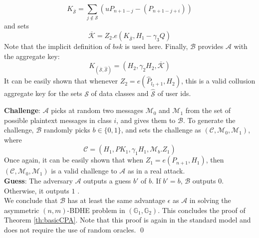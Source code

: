 \begin{equation}
 K_{\overline{\mathcal{S}}} = \sum_{j\notin\mathcal{S}}({u}P_{n+1-j}-(P_{n+1-j+i})) \nonumber
\end{equation}
\noindent and sets
\begin{equation}
 \overline{\mathcal{K}} = Z_2.e(K_{\overline{\mathcal{S}}},H_1-\gamma_3Q)\nonumber
\end{equation}
\noindent Note that the implicit definition of $bsk$ is used here. Finally, $\mathcal{B}$ provides $\mathcal{A}$ with the aggregate key:
\begin{equation}
 K_{\left(\overline{\mathcal{S}},\hat{\mathcal{S}}\right)} = (H_2,\gamma_2H_2,\overline{\mathcal{K}})\nonumber
\end{equation}
\noindent It can be easily shown that whenever $Z_2={e}(\hat{P}_{l_2+1},H_2)$, this is a valid collusion aggregate key for the sets $\mathcal{S}$ of data classes and $\hat{\mathcal{S}}$ of user ids.
 
\noindent \textbf{Challenge}: $\mathcal{A}$ picks at random two messages $\mathcal{M}_0$ and $\mathcal{M}_1$ from the set of possible plaintext messages in class $i$, and gives them to $\mathcal{B}$. To generate the challenge, $\mathcal{B}$ randomly picks $b\in\{0,1\}$, and sets the challenge as $(\mathcal{C},\mathcal{M}_0,\mathcal{M}_1)$, where 
\begin{equation}
\mathcal{C}=(H_1,PK_1,\gamma_1 H_1,\mathcal{M}_b.Z_1)\nonumber
\end{equation}
\noindent Once again, it can be easily shown that when $Z_1={e}(P_{n+1},H_1)$, then $(\mathcal{C},\mathcal{M}_0,\mathcal{M}_1)$ is a valid challenge to $\mathcal{A}$ as in a real attack.\\
 
\noindent \textbf{Guess}: The adversary $\mathcal{A}$ outputs a guess $b'$ of $b$. If $b' = b$, $\mathcal{B}$ outputs $0$. Otherwise, it outputs $1$ .\\

\noindent We conclude that $\mathcal{B}$ has at least the same advantage $\epsilon$ as $\mathcal{A}$ in solving the asymmetric $(n,m)$-BDHE problem in $(\mathbb{G}_1,\mathbb{G}_2)$. This concludes the proof of Theorem \ref{th:basicCPA}. Note that this proof is again in the standard model and does not require the use of random oracles. \hfill\qed

